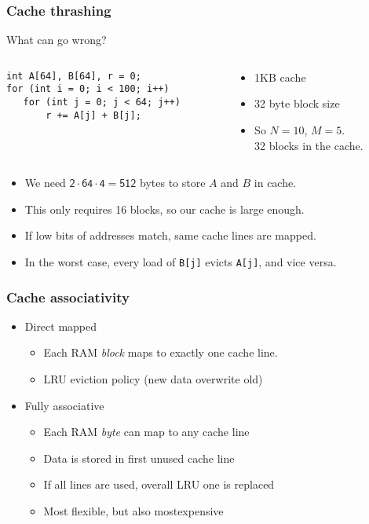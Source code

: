 \documentclass[dvipsnames,presentation,aspectratio=169,14pt]{beamer}
\begin{document}
\begin{frame}[fragile]
  \frametitle{Cache thrashing}
  \begin{block}{What can go wrong?}
    \begin{columns}
      \begin{column}{0.45\textwidth}
\begin{verbatim}
int A[64], B[64], r = 0;
for (int i = 0; i < 100; i++)
   for (int j = 0; j < 64; j++)
       r += A[j] + B[j];
\end{verbatim}
      \end{column}
      \begin{column}{0.45\textwidth}
        \begin{itemize}
        \item 1KB cache
        \item 32 byte block size
        \item So $N=10$, $M=5$. \\32 blocks in the cache.
        \end{itemize}
      \end{column}
    \end{columns}
  \end{block}


    \begin{itemize}
    \item We need $\mathsf{2 \cdot 64 \cdot 4 = 512}$ bytes to store $A$ and $B$
      in cache.
\item This only requires 16 blocks, so our cache is large enough.
    \item If low bits of addresses match, same cache lines are mapped.
    \item In the worst case, every load of \texttt{B[j]} evicts
      \texttt{A[j]}, and vice versa.
    \end{itemize}

\end{frame}

\begin{frame}[t]
  \frametitle{Cache associativity}
  \begin{itemize}[itemsep=8pt]
  \item Direct mapped
    \begin{itemize}[wide=0pt,itemsep=6pt]
    \item Each RAM \emph{block} maps to exactly one cache
      line.
    \item LRU eviction policy (new data overwrite old)
    \end{itemize}
  \item<2> Fully associative
    \begin{itemize}[wide=0pt,itemsep=6pt]
    \item Each RAM \emph{byte} can map to any cache line
    \item Data is stored in first unused cache line
    \item If all lines are used, overall LRU one is replaced
    \item Most flexible, but also mostexpensive
    \end{itemize}
  \end{itemize}
\end{frame}
\end{document}
